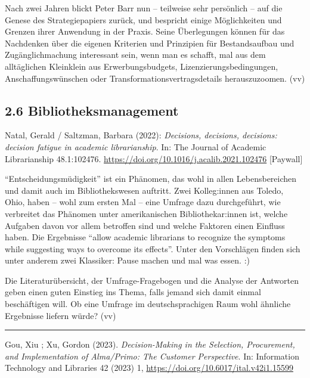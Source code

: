 \documentclass[a4paper,
fontsize=11pt,
oneside,
numbers=noperiodatend,
parskip=half-,
bibliography=totoc,
final
]{scrartcl}
\begin{document}
Nach zwei Jahren blickt Peter Barr nun -- teilweise sehr persönlich --
auf die Genese des Strategiepapiers zurück, und bespricht einige
Möglichkeiten und Grenzen ihrer Anwendung in der Praxis. Seine
Überlegungen können für das Nachdenken über die eigenen Kriterien und
Prinzipien für Bestandsaufbau und Zugänglichmachung interessant sein,
wenn man es schafft, mal aus dem alltäglichen Kleinklein aus
Erwerbungsbudgets, Lizenzierungsbedingungen, Anschaffungswünschen oder
Transformationsvertragsdetails herauszuzoomen. (vv)

\pagebreak

\hypertarget{bibliotheksmanagement}{%
\subsection{2.6 Bibliotheksmanagement}\label{bibliotheksmanagement}}

Natal, Gerald / Saltzman, Barbara (2022): \emph{Decisions, decisions,
decisions: decision fatigue in academic librarianship}. In: The Journal
of Academic Librarianship 48.1:102476.
\url{https://doi.org/10.1016/j.acalib.2021.102476} {[}Paywall{]}

\enquote{Entscheidungsmüdigkeit} ist ein Phänomen, das wohl in allen
Lebensbereichen und damit auch im Bibliothekswesen auftritt. Zwei
Kolleg:innen aus Toledo, Ohio, haben -- wohl zum ersten Mal -- eine
Umfrage dazu durchgeführt, wie verbreitet das Phänomen unter
amerikanischen Bibliothekar:innen ist, welche Aufgaben davon vor allem
betroffen sind und welche Faktoren einen Einfluss haben. Die Ergebnisse
\enquote{allow academic librarians to recognize the symptoms while
suggesting ways to overcome its effects}. Unter den Vorschlägen finden
sich unter anderem zwei Klassiker: Pause machen und mal was essen. :)

Die Literaturübersicht, der Umfrage-Fragebogen und die Analyse der
Antworten geben einen guten Einstieg ins Thema, falls jemand sich damit
einmal beschäftigen will. Ob eine Umfrage im deutschsprachigen Raum wohl
ähnliche Ergebnisse liefern würde? (vv)

\begin{center}\rule{0.5\linewidth}{0.5pt}\end{center}

Gou, Xiu ; Xu, Gordon (2023). \emph{Decision-Making in the Selection,
Procurement, and Implementation of Alma/Primo: The Customer
Perspective}. In: Information Technology and Libraries 42 (2023) 1,
\url{https://doi.org/10.6017/ital.v42i1.15599}
\end{document}
